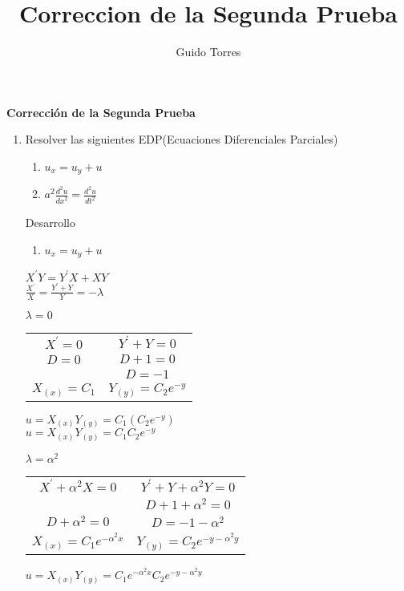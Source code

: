 \documentclass[10pt,a4paper]{article}
\author{Guido Torres}
\title{Correccion de la Segunda Prueba}
\begin{document}
\begin{center}

\textbf{Corrección de la Segunda Prueba}

\end{center}
\begin{enumerate}

\item Resolver las siguientes EDP(Ecuaciones Diferenciales Parciales)

\begin{enumerate}
\item $u_x=u_y+u$
\item $a^2 \frac{d^2u}{{dx}^2}=\frac{d^2u}{{dt}^2}$ 
\end{enumerate}

Desarrollo
\begin{enumerate}
\item $u_x=u_y+u$
\end{enumerate}
\begin{center}
${ X }^{ ' }Y={ Y }^{ ' }X+XY$
\\
$\frac { { X }^{ ' } }{ X } =\frac { { Y }^{ ' }+Y }{ Y } =-\lambda $

\end{center}

\begin{center}
$\lambda=0$
\end{center}
\begin{center}
\begin{tabular}{c c} 
 
${ X }^{ ' }=0$ & ${ Y }^{ ' }+Y=0$   \\ 
$D=0$ & $D+1=0$  \\ 
  & $D=-1$  \\ 
$X_{(x)}=C_1$ & $Y_{(y)}=C_2 e^{-y}$  \\ 
\end{tabular}
\end{center}
$u=X_{(x)} Y_{(y)}=C_1(C_2 e^{-y})$
\\
$u=X_{(x)} Y_{(y)}=C_1C_2 e^{-y}$


\begin{center}
$\lambda=\alpha^2$
\end{center}

\begin{center}
\begin{tabular}{c c} 
 
${ X }^{ ' }+{ \alpha  }^{ 2 }X=0$ & ${ Y }^{ ' }+Y+{\alpha}^2 Y=0$   \\ 
                                   & $D+1+{\alpha}^2=0$  \\ 
$D+{ \alpha  }^{ 2 }=0$ & $D=-1-{\alpha}^2$  \\ 
$X_{(x)}=C_1 e^{-{\alpha}^2 x}$ & $Y_{(y)}=C_2 e^{-y-{\alpha}^2 y}$  \\ 
\end{tabular}
\end{center}
$u=X_{(x)} Y_{(y)}=C_1 e^{-{\alpha}^2 x} C_2 e^{-y-{\alpha}^2 y}$



\end{enumerate}
\end{document}
